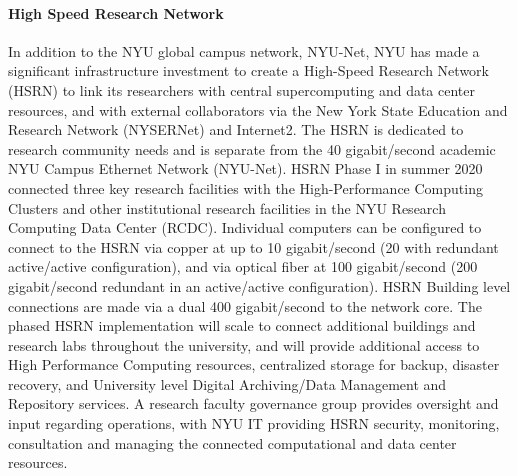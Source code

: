 \paragraph{High Speed Research Network}
In addition to the NYU global campus network, NYU-Net, NYU has made a significant infrastructure investment to create a High-Speed Research Network (HSRN) to link its researchers with central supercomputing and data center resources, and with external collaborators via the New York State Education and Research Network (NYSERNet) and Internet2. The HSRN is dedicated to research community needs and is separate from the 40 gigabit/second academic NYU Campus Ethernet Network (NYU-Net). HSRN Phase I in summer 2020 connected three key research facilities with the High-Performance Computing Clusters and other institutional research facilities in the NYU Research Computing Data Center (RCDC). Individual computers can be configured to connect to the HSRN via copper at up to 10 gigabit/second (20 with redundant active/active configuration), and via optical fiber at 100 gigabit/second (200 gigabit/second redundant in an active/active configuration). HSRN Building level connections are made via a dual 400 gigabit/second to the network core. The phased HSRN implementation will scale to connect additional buildings and research labs throughout the university, and will provide additional access to High Performance Computing resources, centralized storage for backup, disaster recovery, and University level Digital Archiving/Data Management and Repository services. A research faculty governance group provides oversight and input regarding operations, with NYU IT providing HSRN security, monitoring, consultation and managing the connected computational and data center resources.



